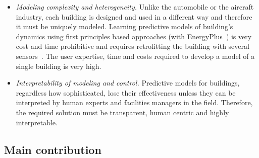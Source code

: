 \begin{itemize}[leftmargin=1cm]
\item \emph{Modeling complexity and heterogeneity.} Unlike the automobile or the aircraft industry, each building is designed and used in a different way and therefore it must be uniquely modeled. Learning predictive models of building's dynamics using first principles based approaches (\eg with EnergyPlus~\cite{Crawley2001319}) is very cost and time prohibitive and requires retrofitting the building with several sensors~\cite{costmpc}. The user expertise, time and costs required to develop a model of a single building is very high.
\item \emph{Interpretability of modeling and control.} Predictive models for buildings, regardless how sophisticated, lose their effectiveness unless they can be interpreted by human experts and facilities managers in the field. Therefore, the required solution must be transparent, human centric and highly interpretable.
\end{itemize}

\subsection{Main contribution}

